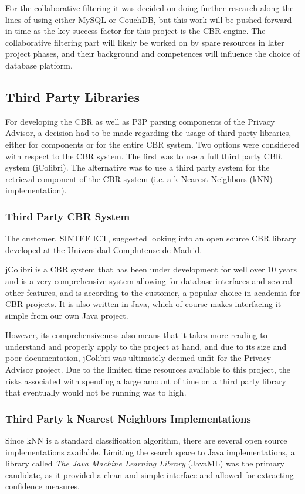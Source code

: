 For the collaborative filtering it was decided on doing further research along the lines of using either MySQL or CouchDB, but this work will be pushed forward in time as the key success factor for this project is the CBR engine. The collaborative filtering part will likely be worked on by spare resources in later project phases, and their background and competences will influence the choice of database platform.

\subsection{Third Party Libraries}
 
For developing the CBR as well as P3P parsing components of the Privacy Advisor, a decision had to be made regarding the usage of third party libraries, either for components or for the entire CBR system. Two options were considered with respect to the CBR system. The first was to use a full third party CBR system (jColibri). The alternative was to use a third party system for the retrieval component of the CBR system (i.e. a k Nearest Neighbors (kNN) implementation).


\subsubsection{Third Party CBR System}

The customer, SINTEF ICT, suggested looking into an open source CBR library developed at the Universidad Complutense de Madrid.
 
jColibri is a CBR system that has been under development for well over 10 years and is a very comprehensive system allowing for database interfaces and several other features,  and is according to the customer, a popular choice in academia for CBR projects. It is also written in Java, which of course makes interfacing it simple from our own Java project.
 
However, its comprehensiveness also means that it takes more reading to understand and properly apply to the project at hand, and due to its size and poor documentation, jColibri was ultimately deemed unfit for the Privacy Advisor project. Due to the limited time resources available to this project, the risks associated with spending a large amount of time on a third party library that eventually would not be running was to high.
 
\subsubsection{Third Party k Nearest Neighbors Implementations}
Since kNN is a standard classification algorithm, there are several open source implementations available. Limiting the search space to Java implementations, a library called \emph{The Java Machine Learning Library} (JavaML) was the primary candidate, as it provided a clean and simple interface and allowed for extracting confidence measures.
 
